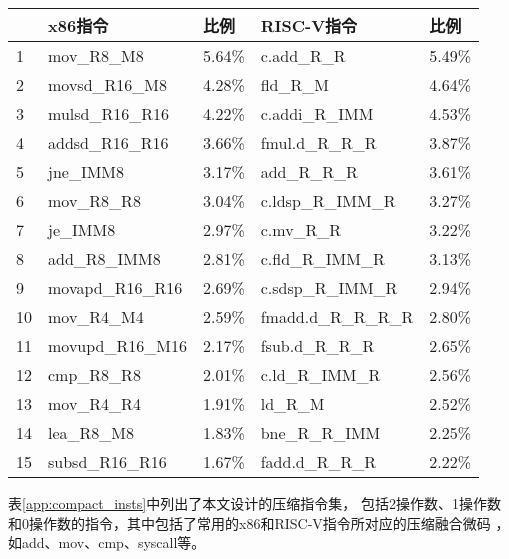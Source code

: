 \begin{table}[]
  \centering
  \label{tab:spec_insts}
  \begin{tabular}{l|ll|ll}
    \hline
     & x86指令            & 比例     & RISC-V指令             & 比例     \\ \hline
  1  & mov\_R8\_M8      & 5.64\% & c.add\_R\_R         & 5.49\% \\
  2  & movsd\_R16\_M8   & 4.28\% & fld\_R\_M           & 4.64\% \\
  3  & mulsd\_R16\_R16  & 4.22\% & c.addi\_R\_IMM      & 4.53\% \\
  4  & addsd\_R16\_R16  & 3.66\% & fmul.d\_R\_R\_R     & 3.87\% \\
  5  & jne\_IMM8        & 3.17\% & add\_R\_R\_R        & 3.61\% \\
  6  & mov\_R8\_R8      & 3.04\% & c.ldsp\_R\_IMM\_R   & 3.27\% \\
  7  & je\_IMM8         & 2.97\% & c.mv\_R\_R          & 3.22\% \\
  8  & add\_R8\_IMM8    & 2.81\% & c.fld\_R\_IMM\_R    & 3.13\% \\
  9  & movapd\_R16\_R16 & 2.69\% & c.sdsp\_R\_IMM\_R   & 2.94\% \\
  10 & mov\_R4\_M4      & 2.59\% & fmadd.d\_R\_R\_R\_R & 2.80\% \\
  11 & movupd\_R16\_M16 & 2.17\% & fsub.d\_R\_R\_R     & 2.65\% \\
  12 & cmp\_R8\_R8      & 2.01\% & c.ld\_R\_IMM\_R     & 2.56\% \\
  13 & mov\_R4\_R4      & 1.91\% & ld\_R\_M            & 2.52\% \\
  14 & lea\_R8\_M8      & 1.83\% & bne\_R\_R\_IMM      & 2.25\% \\
  15 & subsd\_R16\_R16  & 1.67\% & fadd.d\_R\_R\_R     & 2.22\% \\ \hline
  \end{tabular}
  \end{table}





表\ref{app:compact_insts}中列出了本文设计的压缩指令集，
包括2操作数、1操作数和0操作数的指令，其中包括了常用的x86和RISC-V指令所对应的压缩融合微码
，如add、mov、cmp、syscall等。

